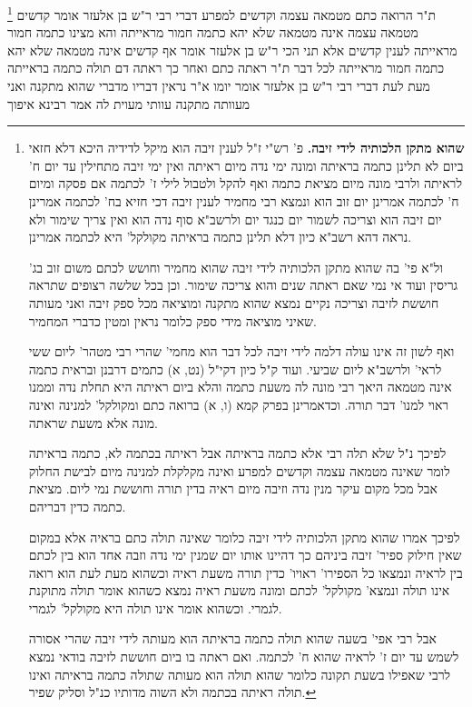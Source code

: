 \documentclass[12pt, openany]{book}
\newcommand{\footnotecomment}[1]{
	\renewcommand\thefootnote{}
	\footnote{#1}}
\newcommand{\commenta}[1]{\footnotecomment{#1}}
\begin{document}
{\commenta{\textbf{שהוא מתקן הלכותיה לידי זיבה.} פ' רש"י ז"ל לענין זיבה הוא מיקל לדידיה היכא דלא חזאי ביום לא תלינן כתמה בראיתה ומונה ימי נדה מיום ראיתה ואין ימי זיבה מתחילין עד יום ח' לראיתה ולרבי מונה מיום מציאת כתמה ואף להקל ולטבול לילי ז' לכתמה אם פסקה ומיום ח' לכתמה אמרינן יום זוב הוא ונמצא רבי מחמיר לענין זיבה דכי חזיא בח' לכתמה אמרינן יום זיבה הוא וצריכה לשמור יום כנגד יום ולרשב"א סוף נדה הוא ואין צריך שימור ולא נראה דהא רשב"א כיון דלא תלינן כתמה בראיתה מקולקל' היא לכתמה אמרינן.\par ול"א פי' בה שהוא מתקן הלכותיה לידי זיבה שהוא מחמיר וחושש לכתם משום זוב בג' גריסין ועוד אי נמי שאם ראתה שנים והוא צריכה שימור. וכן בכל שלשה רצופים שתראה חוששת לזיבה וצריכה נקיים נמצא שהוא מתקנה ומוציאה מכל ספק זיבה ואני מעותה שאיני מוציאה מידי ספק כלומר נראין ומטין כדברי המחמיר.\par ואף לשון זה אינו עולה דלמה לידי זיבה לכל דבר הוא מחמי' שהרי רבי מטהר' ליום ששי לראי' ולרשב"א ליום שביעי. ועוד ק"ל כיון דקי"ל (נט, א) כתמים דרבנן ובראית כתמה אינה מטמאה היאך רבי מונה לה משעת כתמה והלא ביום ראיתה היא תחלת נדה וממנו ראוי למנו' דבר תורה. וכדאמרינן בפרק קמא (ו, א) ברואה כתם ומקולקל' למנינה ואינה מונה אלא משעת שראתה.\par לפיכך נ"ל שלא תלה רבי אלא כתמה בראיתה אבל ראיתה בכתמה לא, כתמה בראיתה לומר שאינה מטמאה עצמה וקדשים למפרע ואינה מקלקלת למנינה מיום לבישת החלוק אבל מכל מקום עיקר מנין נדה וזיבה מיום ראיה בדין תורה וחוששת נמי ליום. מציאת כתמה כדין דבריהם.\par לפיכך אמרו שהוא מתקן הלכותיה לידי זיבה כלומר שאינה תולה כתם בראיה אלא במקום שאין חילוק ספיר' זיבה ביניהם כך דהיינו אותו יום שמנין ימי נדה וזבה אחד הוא בין לכתם בין לראיה ונמצאו כל הספירו' ראויו' כדין תורה משעת ראיה וכשהוא מעת לעת הוא רואה אינו תולה ונמצא' מקולקל' לכתם ומונה משעת ראיה נמצא כשהוא אומר תולה מתוקנת לגמרי. וכשהוא אומר אינו תולה היא מקולקל' לגמרי.\par אבל רבי אפי' בשעה שהוא תולה כתמה בראיתה הוא מעותה לידי זיבה שהרי אסורה לשמש עד יום ז' לראיה שהוא ח' לכתמה. ואם ראתה בו ביום חוששת לזיבה בודאי נמצא לרבי שאפילו בשעת תקונה כלומר שהוא תולה הוא מעותה שתולה כתמה בראיתה ואינו תולה ראיתה בכתמה ולא השוה מדותיו כנ"ל וסליק שפיר. }
ת"ר הרואה כתם מטמאה עצמה וקדשים למפרע דברי רבי 
ר"ש בן אלעזר אומר קדשים מטמאה עצמה אינה מטמאה שלא יהא כתמה חמור מראייתה 
והא מצינו כתמה חמור מראייתה לענין קדשים 
אלא תני הכי ר"ש בן אלעזר אומר אף קדשים אינה מטמאה שלא יהא כתמה חמור מראייתה לכל דבר 
ת"ר ראתה כתם ואחר כך ראתה דם תולה כתמה בראייתה מעת לעת דברי רבי 
ר"ש בן אלעזר אומר יומו א"ר נראין דבריו מדברי שהוא מתקנה ואני מעוותה 
מתקנה עוותי מעוית לה אמר רבינא איפוך 
}
\end{document}
